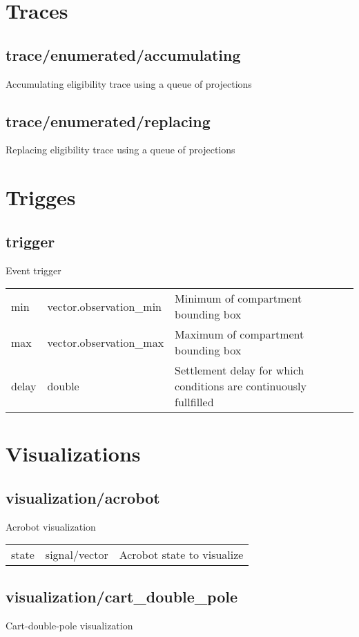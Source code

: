 \section{Traces}
\subsection{trace/enumerated/accumulating}
\noindent Accumulating eligibility trace using a queue of projections\\

\subsection{trace/enumerated/replacing}
\noindent Replacing eligibility trace using a queue of projections\\

\section{Trigges}
\subsection{trigger}
\noindent Event trigger\\

\noindent\begin{tabular}{@{}lll@{}}
min&vector.observation\_min&Minimum of compartment bounding box\\
max&vector.observation\_max&Maximum of compartment bounding box\\
delay&double&Settlement delay for which conditions are continuously fullfilled\\
\end{tabular}
\section{Visualizations}
\subsection{visualization/acrobot}
\noindent Acrobot visualization\\

\noindent\begin{tabular}{@{}lll@{}}
state&signal/vector&Acrobot state to visualize\\
\end{tabular}
\subsection{visualization/cart\_double\_pole}
\noindent Cart-double-pole visualization\\

